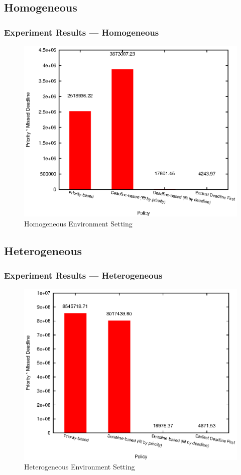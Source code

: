 \documentclass{beamer}
\begin{document}
\subsection{Homogeneous}
\begin{frame}
  \frametitle{Experiment Results --- Homogeneous}
  \begin{figure}[htbp]
    \centering
    \includegraphics[width=\textwidth,height=0.7\textheight,keepaspectratio]{figures/homo.eps}
    \caption{Homogeneous Environment Setting}
  \end{figure}
\end{frame}

\subsection{Heterogeneous}
\begin{frame}
  \frametitle{Experiment Results --- Heterogeneous}
  \begin{figure}[htbp]
    \centering
    \includegraphics[width=\textwidth,height=0.7\textheight,keepaspectratio]{figures/hetero.eps}
    \caption{Heterogeneous Environment Setting}
  \end{figure}
\end{frame}
\end{document}
